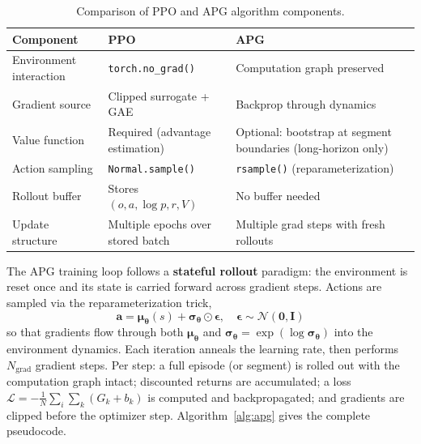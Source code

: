 \documentclass[11pt,a4paper]{article}
\newcommand{\cL}{\mathcal{L}}
\newcommand{\btheta}{\bm{\theta}}
\newcommand{\bepsilon}{\bm{\epsilon}}
\newcommand{\bmu}{\bm{\mu}}
\newcommand{\bsigma}{\bm{\sigma}}
\newcommand{\ba}{\mathbf{a}}
\begin{document}
\begin{table}[htbp]
  \centering
  \caption{Comparison of PPO and APG algorithm components.}
  \label{tab:ppo_vs_apg}
  \setlength{\extrarowheight}{3pt}
  \begin{tabularx}{\linewidth}{@{} l >{\raggedright\arraybackslash}X >{\raggedright\arraybackslash}X @{}}
    \toprule
    \rowcolor{gray!15}
    \textbf{Component} & \textbf{PPO} & \textbf{APG} \\
    \midrule
    Environment interaction  & \texttt{torch.no\_grad()}         & Computation graph preserved \\
    \rowcolor{gray!8}
    Gradient source          & Clipped surrogate + GAE            & Backprop through dynamics \\
    Value function           & Required (advantage estimation)    & Optional: bootstrap at segment boundaries (long-horizon only) \\
    \rowcolor{gray!8}
    Action sampling          & \texttt{Normal.sample()}           & \texttt{rsample()} (reparameterization) \\
    Rollout buffer           & Stores $(o, a, \log p, r, V)$     & No buffer needed \\
    \rowcolor{gray!8}
    Update structure         & Multiple epochs over stored batch  & Multiple grad steps with fresh rollouts \\
    \bottomrule
  \end{tabularx}
\end{table}

The APG training loop follows a \textbf{stateful rollout} paradigm: the environment is reset once and its state is carried forward across gradient steps. Actions are sampled via the reparameterization trick,
\begin{equation}
  \ba = \bmu_{\btheta}(s) + \bsigma_{\btheta} \odot \bepsilon, \quad \bepsilon \sim \mathcal{N}(\mathbf{0}, \mathbf{I})
  \label{eq:reparam}
\end{equation}
so that gradients flow through both $\bmu_{\btheta}$ and $\bsigma_{\btheta} = \exp(\log\bsigma_{\btheta})$ into the environment dynamics. Each iteration anneals the learning rate, then performs $N_{\text{grad}}$ gradient steps. Per step: a full episode (or segment) is rolled out with the computation graph intact; discounted returns are accumulated; a loss $\cL = -\frac{1}{N}\sum_{i}\sum_{k}(G_k + b_k)$ is computed and backpropagated; and gradients are clipped before the optimizer step. Algorithm~\ref{alg:apg} gives the complete pseudocode.
\end{document}

